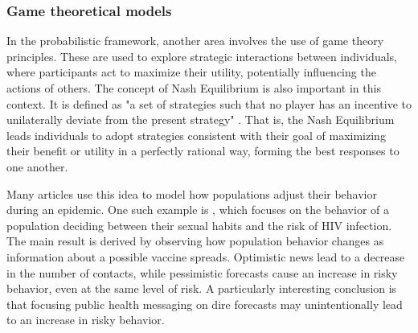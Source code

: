 \subsubsection{Game theoretical models}
In the probabilistic framework, another area involves the use of game theory principles. These are used to explore strategic interactions between individuals, where participants act to maximize their utility, potentially influencing the actions of others. The concept of Nash Equilibrium is also important in this context. It is defined as "a set of strategies such that no player has an incentive to unilaterally deviate from the present strategy" \cite{Wang_2015_review}. That is, the Nash Equilibrium leads individuals to adopt strategies consistent with their goal of maximizing their benefit or utility in a perfectly rational way, forming the best responses to one another.

Many articles use this idea to model how populations adjust their behavior during an epidemic. One such example is  \cite{Auld_2003}, which focuses on the behavior of a population deciding between their sexual habits and the risk of HIV infection. The main result is derived by observing how population behavior changes as information about a possible vaccine spreads. Optimistic news lead to a decrease in the number of contacts, while pessimistic forecasts cause an increase in risky behavior, even at the same level of risk. A particularly interesting conclusion is that focusing public health messaging on dire forecasts may unintentionally lead to an increase in risky behavior.

